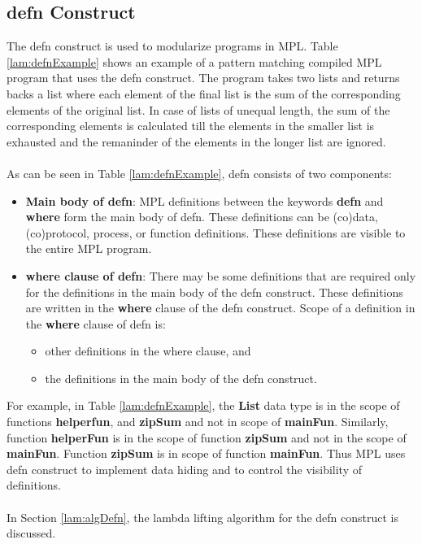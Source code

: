 \documentclass[11pt]{article}
\begin{document}
\subsection {defn Construct}\label{lam:defnOverview}
The {\sf defn} construct is used to modularize programs in MPL. Table \ref {lam:defnExample} shows an example of a pattern matching compiled MPL program that uses the {\sf defn} construct. The program takes two lists and returns backs a list where each element of the final list is the sum of the corresponding elements of the original list. In case of lists of unequal length, the sum of the corresponding elements is calculated till the elements in the smaller list is exhausted and the remaninder of the elements in the longer list are ignored. 
~~\\~~\\
As can be seen in Table \ref {lam:defnExample}, {\sf defn} consists of two components:
\begin{itemize}
  \item {\bf Main body of defn}: MPL definitions between the keywords {\bf defn} and {\bf where} form the main body of {\sf defn}. These definitions can be (co)data, (co)protocol, process, or function definitions. These definitions are visible to the entire MPL program.

  \item {\bf where clause of defn}: There may be some definitions that are required only for the definitions in the main body of the {\sf defn} construct. These definitions are written in the {\bf where} clause of the {\sf defn} construct. Scope of a definition in the {\bf where} clause of {\sf defn} is:
  \begin{itemize}
    \item other definitions in the where clause, and
    \item the definitions in the main body of the {\sf defn} construct.
  \end{itemize}
\end{itemize}
For example, in Table \ref {lam:defnExample}, the {\bf List} data type is in the scope of functions {\bf helperfun}, and {\bf zipSum} and not in scope of {\bf mainFun}. Similarly, function {\bf helperFun} is in the scope of function {\bf zipSum} and not in the scope of {\bf mainFun}. Function {\bf zipSum} is in scope of function {\bf mainFun}. Thus MPL uses {\sf defn} construct to implement data hiding and to control the visibility of definitions.
~~\\ ~~\\
In Section \ref {lam:algDefn}, the lambda lifting algorithm for the {\sf defn} construct is discussed.
\end{document}
